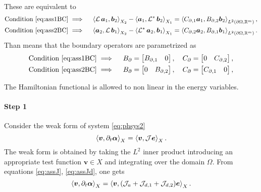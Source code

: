 \begin{assumption}
	These are  equivalent to
	\begin{align}
	&\text{Condition } \eqref{eq:ass1BC} \implies \quad
	\inner[X_2]{\mathcal{L}\, \bm{a}_1}{\bm{b}_2} - \inner[X_1]{\bm{a}_1}{\mathcal{L}^* \, \bm{b}_2} = \inner[L^2(\partial \Omega, \mathbb{R}^m)]{C_{\partial, 1} \bm{a}_1}{B_{\partial, 2}  \bm{b}_2}, \\
	&\text{Condition } \eqref{eq:ass2BC} \implies \quad
	\inner[X_2]{\bm{a}_2}{\mathcal{L}\,\bm{b}_1} - \inner[X_1]{\mathcal{L}^* \, \bm{a}_2}{\bm{b}_1} = \inner[L^2(\partial \Omega, \mathbb{R}^m)]{C_{\partial, 2} \bm{a}_2}{B_{\partial, 1} \bm{b}_1}.
	\end{align}
	Than means that the boundary operators are parametrized as 
	\begin{align}
	\text{Condition } \eqref{eq:ass1BC} \implies \quad B_\partial = \begin{bmatrix}
	B_{\partial, 1} & 0 \\
	\end{bmatrix}, \quad C_\partial = \begin{bmatrix}
	0 & C_{\partial, 2} \\
	\end{bmatrix}, \\
	\text{Condition } \eqref{eq:ass2BC} \implies \quad B_\partial = \begin{bmatrix}
	0 & B_{\partial, 2} \\
	\end{bmatrix}, \quad C_\partial = \begin{bmatrix}
	C_{\partial, 1} & 0 \\
	\end{bmatrix},
	\end{align}
\end{assumption}

The Hamiltonian functional is allowed to non linear in the energy variables. 

\paragraph{Step 1} Consider the weak form of system \eqref{eq:phsys2}
\begin{equation}
\inner[X]{\bm{v}}{\partial_t \bm{\alpha}} = \inner[X]{\bm{v}}{\mathcal{J} \bm{e}}.
\end{equation}
The weak form is obtained by taking the $L^2$ inner product introducing an appropriate test function $\bm{v} \in X$ and integrating over the domain $\Omega$. From equations \eqref{eq:assJ}, \eqref{eq:assJd}, one gets 
\begin{equation}
\inner[X]{\bm{v}}{\partial_t \bm{\alpha}} = \inner[X]{\bm{v}}{(\mathcal{J}_a + \mathcal{J}_{d, 1} + \mathcal{J}_{d, 2}) \bm{e}}.
\end{equation}
